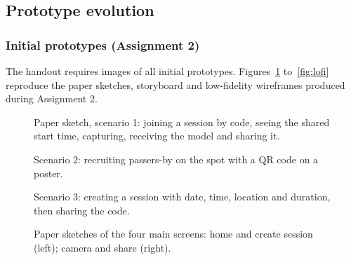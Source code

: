 
\subsection{Prototype evolution}

\subsubsection{Initial prototypes (Assignment 2)}

The handout requires images of all initial prototypes. Figures~\ref{fig:sketch1}
to~\ref{fig:lofi} reproduce the paper sketches, storyboard and low-fidelity wireframes produced
during Assignment 2.

\begin{figure}[htbp]
\centering
{}
\caption{Paper sketch, scenario 1: joining a session by code, seeing the shared start time,
capturing, receiving the model and sharing it.}
\label{fig:sketch1}
\end{figure}

\begin{figure}[htbp]
\centering
{}
\caption{Scenario 2: recruiting passers-by on the spot with a QR code on a poster.}
\label{fig:sketch2}
\end{figure}

\begin{figure}[htbp]
\centering
{}
\caption{Scenario 3: creating a session with date, time, location and duration, then sharing the
code.}
\label{fig:sketch3}
\end{figure}

\begin{figure}[htbp]
\centering
{}\hfill
{}
\caption{Paper sketches of the four main screens: home and create session (left); camera and share
(right).}
\label{fig:sketch4}
\end{figure}

